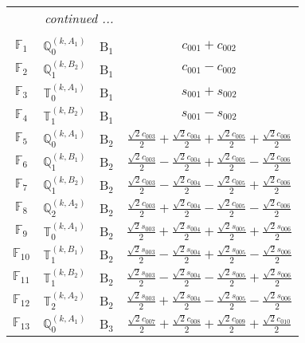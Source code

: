 \documentclass[fleqn,10pt,landscape]{article}
\begin{document}
\begin{itemize}
\begin{center}
\begin{longtable}{c|c|c|c}
 \hline \hline
\multicolumn{3}{r}{\footnotesize\it continued ...} \\ \endfoot

 \hline \hline
\multicolumn{3}{r}{} \\ \endlastfoot

$ \mathbb{F}_{1} $ & $\mathbb{Q}_{0}^{(k,A_{1})}$ & B$_{1}$ & $c_{001} + c_{002}$ \\
$ \mathbb{F}_{2} $ & $\mathbb{Q}_{1}^{(k,B_{2})}$ & B$_{1}$ & $c_{001} - c_{002}$ \\
$ \mathbb{F}_{3} $ & $\mathbb{T}_{0}^{(k,A_{1})}$ & B$_{1}$ & $s_{001} + s_{002}$ \\
$ \mathbb{F}_{4} $ & $\mathbb{T}_{1}^{(k,B_{2})}$ & B$_{1}$ & $s_{001} - s_{002}$ \\ \hline
$ \mathbb{F}_{5} $ & $\mathbb{Q}_{0}^{(k,A_{1})}$ & B$_{2}$ & $\frac{\sqrt{2} c_{003}}{2} + \frac{\sqrt{2} c_{004}}{2} + \frac{\sqrt{2} c_{005}}{2} + \frac{\sqrt{2} c_{006}}{2}$ \\
$ \mathbb{F}_{6} $ & $\mathbb{Q}_{1}^{(k,B_{1})}$ & B$_{2}$ & $\frac{\sqrt{2} c_{003}}{2} - \frac{\sqrt{2} c_{004}}{2} + \frac{\sqrt{2} c_{005}}{2} - \frac{\sqrt{2} c_{006}}{2}$ \\
$ \mathbb{F}_{7} $ & $\mathbb{Q}_{1}^{(k,B_{2})}$ & B$_{2}$ & $\frac{\sqrt{2} c_{003}}{2} - \frac{\sqrt{2} c_{004}}{2} - \frac{\sqrt{2} c_{005}}{2} + \frac{\sqrt{2} c_{006}}{2}$ \\
$ \mathbb{F}_{8} $ & $\mathbb{Q}_{2}^{(k,A_{2})}$ & B$_{2}$ & $\frac{\sqrt{2} c_{003}}{2} + \frac{\sqrt{2} c_{004}}{2} - \frac{\sqrt{2} c_{005}}{2} - \frac{\sqrt{2} c_{006}}{2}$ \\
$ \mathbb{F}_{9} $ & $\mathbb{T}_{0}^{(k,A_{1})}$ & B$_{2}$ & $\frac{\sqrt{2} s_{003}}{2} + \frac{\sqrt{2} s_{004}}{2} + \frac{\sqrt{2} s_{005}}{2} + \frac{\sqrt{2} s_{006}}{2}$ \\
$ \mathbb{F}_{10} $ & $\mathbb{T}_{1}^{(k,B_{1})}$ & B$_{2}$ & $\frac{\sqrt{2} s_{003}}{2} - \frac{\sqrt{2} s_{004}}{2} + \frac{\sqrt{2} s_{005}}{2} - \frac{\sqrt{2} s_{006}}{2}$ \\
$ \mathbb{F}_{11} $ & $\mathbb{T}_{1}^{(k,B_{2})}$ & B$_{2}$ & $\frac{\sqrt{2} s_{003}}{2} - \frac{\sqrt{2} s_{004}}{2} - \frac{\sqrt{2} s_{005}}{2} + \frac{\sqrt{2} s_{006}}{2}$ \\
$ \mathbb{F}_{12} $ & $\mathbb{T}_{2}^{(k,A_{2})}$ & B$_{2}$ & $\frac{\sqrt{2} s_{003}}{2} + \frac{\sqrt{2} s_{004}}{2} - \frac{\sqrt{2} s_{005}}{2} - \frac{\sqrt{2} s_{006}}{2}$ \\ \hline
$ \mathbb{F}_{13} $ & $\mathbb{Q}_{0}^{(k,A_{1})}$ & B$_{3}$ & $\frac{\sqrt{2} c_{007}}{2} + \frac{\sqrt{2} c_{008}}{2} + \frac{\sqrt{2} c_{009}}{2} + \frac{\sqrt{2} c_{010}}{2}$ \\

\end{longtable}
\end{center}
\end{itemize}
\end{document}
